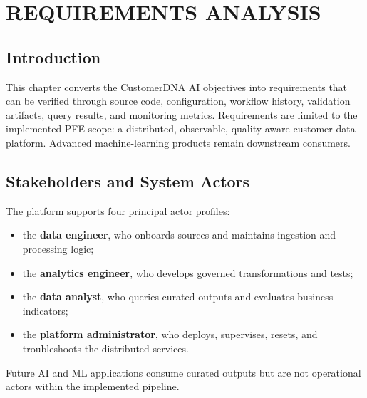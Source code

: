 \clearpage
\chapter{REQUIREMENTS ANALYSIS}

\section{Introduction}
This chapter converts the CustomerDNA AI objectives into requirements that can be verified through source code, configuration, workflow history, validation artifacts, query results, and monitoring metrics. Requirements are limited to the implemented PFE scope: a distributed, observable, quality-aware customer-data platform. Advanced machine-learning products remain downstream consumers.

\section{Stakeholders and System Actors}
The platform supports four principal actor profiles:
\begin{itemize}
    \item the \textbf{data engineer}, who onboards sources and maintains ingestion and processing logic;
    \item the \textbf{analytics engineer}, who develops governed transformations and tests;
    \item the \textbf{data analyst}, who queries curated outputs and evaluates business indicators;
    \item the \textbf{platform administrator}, who deploys, supervises, resets, and troubleshoots the distributed services.
\end{itemize}
Future AI and ML applications consume curated outputs but are not operational actors within the implemented pipeline.

